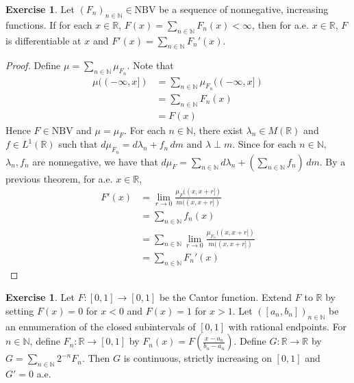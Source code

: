 \documentclass{book}
\theoremstyle{definition}
\newtheorem{ex}[definition]{Exercise}
\newcommand{\lam}{\lambda}
\newcommand{\N}{\mathbb{N}}
\newcommand{\R}{\mathbb{R}}
\newcommand{\lex}[1]{\label{ex:#1}}
\DeclareMathOperator*{\0}{\mbf{0}}
\DeclareMathOperator*{\1}{\mbf{1}}
\newcommand{\dm}{\, d m}
\newcommand{\NBV}{\text{NBV}}
\begin{document}
	\begin{ex} \lex{00000} 
		Let $(F_n)_{n\in \N} \in \NBV$ be a sequence of nonnegative, increasing functions. If for each $x \in \R$, $F(x)=\sum_{n \in \N}F_n(x)< \infty$, then for a.e. $x \in \R$, $F$ is differentiable at $x$ and $F'(x) = \sum_{n\in \N}F_n'(x)$. 
	\end{ex}
	
	\begin{proof}
		
		Define $\mu = \sum_{n \in \N}\mu_{F_n}$. Note that 
		\begin{align*}
			\mu((-\infty,x]) 
			&= \sum_{n \in \N}\mu_{F_n}((-\infty,x]) \\
			&= \sum_{n \in \N}F_n(x)\\
			&= F(x)
		\end{align*}
		Hence $F \in \NBV$ and $\mu=\mu_F$. For each $n \in \N$, there exist $\lam_n \in M(\R)$ and $f \in L^1(\R)$ such that $d\mu_{F_n} = d\lam_n + f_n\dm$ and $\lam \perp m$. Since for each $n \in \N$, $\lam_n, f_n$ are nonnegative, we have that $d\mu_F =  \sum_{n \in \N} d\lam_n + (\sum_{n \in \N}f_n)\dm$. By a previous theorem, for a.e. $x \in \R$, 
		\begin{align*}
			F'(x) 
			&= \lim_{r \rightarrow 0}\frac{\mu_F((x,x+r])}{m((x,x+r])} \\
			&= \sum_{n \in \N}f_n(x)\\
			&= \sum_{n \in \N}\lim_{r \rightarrow 0}\frac{\mu_{F_n}((x,x+r])}{m((x,x+r])} \\
			&= \sum_{n \in \N}F_n'(x)
		\end{align*}
	\end{proof}
	
	\begin{ex} \lex{00000} 
		Let $F:[0,1]\rightarrow [0, 1]$ be the Cantor function. Extend $F$ to $\R$ by setting $F(x) = 0$ for $x<0$ and $F(x)=1$ for $x>1$. Let $([a_n,b_n])_{n \in \N}$ be an ennumeration of the closed subintervals of $[0,1]$ with rational endpoints. For $n \in \N$, define $F_n:\R \rightarrow [0,1]$ by $F_n(x) = F(\frac{x-a_n}{b_n-a_n})$. Define $G:\R \rightarrow \R$ by $G = \sum_{n \in \N}2^{-n}F_n$. Then $G$ is continuous, strictly increasing on $[0,1]$ and $G'=0$ a.e.
	\end{ex}
	
\end{document}

